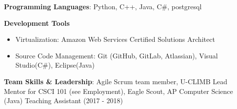 \vspace{-2.0mm}


\begin{cventries}
\vspace{-5mm}
  \cventry
    {}
    {}
    {}
    {}
    {
      \begin{cvitems}
        \item {\textbf{Programming Languages}: Python, C++, Java, C\#,
    postgresql}
        \item {\textbf{Development Tools}}
        \begin{itemize}
        \item {Virtualization: Amazon Web Services
            Certified Solutions Architect}
        \item {Source Code Management: Git (GitHub, GitLab, Atlassian),
            Visual Studio(C\#), Eclipse(Java)}
        \end {itemize}
        \item {\textbf{Team Skills \& Leadership}: Agile Scrum team
            member, U-CLIMB Lead Mentor for CSCI 101 (see Employment),
    Eagle Scout, AP Computer Science (Java) Teaching Assistant (2017 -
    2018)}
      \end{cvitems}
    }
\end{cventries}
